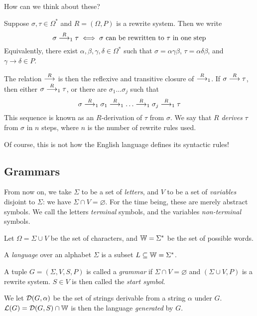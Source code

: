 \documentclass{article}
\begin{document}
How can we think about these?

\begin{remark}
	Suppose $\sigma, \tau \in \Omega^*$ and $R = (\Omega, P)$ is a rewrite system. Then we write
	\[
		\sigma \stackrel{R}{\longrightarrow}_1 \tau \iff \text{$\sigma$ can be rewritten to $\tau$ in one step}
	\] 
	Equivalently, there exist $\alpha, \beta, \gamma, \delta \in \Omega^*$ such that $\sigma = \alpha \gamma \beta$, $\tau = \alpha \delta \beta$, and $\gamma \to \delta \in P$.
		
	The relation $\stackrel{R}{\longrightarrow}$ is then the reflexive and transitive closure of $\stackrel{R}{\longrightarrow}_1$. If $\sigma \stackrel{R}{\longrightarrow} \tau$, then either $\sigma \stackrel{R}{\longrightarrow}_1 \tau$, or there are $\sigma_1 \dots \sigma_j$ such that
	\[
		\sigma \stackrel{R}{\longrightarrow}_1 \sigma_1 \stackrel{R}{\longrightarrow}_1 \dots \stackrel{R}{\longrightarrow}_1 \sigma_j \stackrel{R}{\longrightarrow}_1 \tau
	\]
	This sequence is known as an $R$-derivation of $\tau$ from $\sigma$. We say that $R$ \textit{derives} $\tau$ from $\sigma$ in $n$ steps, where $n$ is the number of rewrite rules used.
\end{remark}

Of course, this is not how the English language defines its syntactic rules!

\subsection{Grammars}

From now on, we take $\Sigma$ to be a set of \textit{letters}, and $V$ to be a set of \textit{variables} disjoint to $\Sigma$: we have $\Sigma \cap V = \varnothing$. For the time being, these are merely abstract symbols. We call the letters \textit{terminal} symbols, and the variables \textit{non-terminal} symbols.

Let $\Omega = \Sigma \cup V$ be the set of characters, and $\mathbb{W} = \Sigma^*$ be the set of possible words.

\begin{definition}
	A \textit{language} over an alphabet $\Sigma$ is a subset $L \subseteq \mathbb{W} = \Sigma^*$.
\end{definition}

\begin{definition}
	A tuple $G = (\Sigma, V, S, P)$ is called a \textit{grammar} if $\Sigma \cap V = \varnothing$ and $(\Sigma \cup V, P)$ is a rewrite system. $S \in V$ is then called the \textit{start symbol}.
		
	We let $\mathcal{D} (G, \alpha)$ be the set of strings derivable from a string $\alpha$ under $G$. $\mathcal{L}(G) = \mathcal{D}(G,S) \cap \mathbb{W}$ is then the language \textit{generated} by $G$.
\end{definition}
\end{document}
